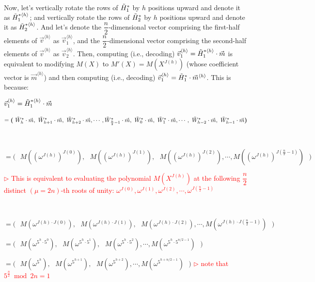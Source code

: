 Now, let's vertically rotate the rows of $\tilde{H}_1^*$ by $h$ positions upward and denote it as $\tilde{H}_1^{*\langle h \rangle}$; and vertically rotate the rows of $\tilde{H}_2^*$ by $h$ positions upward and denote it as $\tilde{H}_2^{*\langle h \rangle}$. And let's denote the $\dfrac{n}{2}$-dimensional vector comprising the first-half elements of $\vec{v}^{\langle h \rangle}$ as $\vec{v}_1^{\langle h \rangle}$, and the $\dfrac{n}{2}$-dimensional vector comprising the second-half elements of $\vec{v}^{\langle h \rangle}$ as $\vec{v}_2^{\langle h \rangle}$. 
Then, computing (i.e., decoding) $\vec{v}_1^{\langle h \rangle} = \tilde{H}_1^{*\langle h \rangle}\cdot \vec{m}$ is equivalent to modifying $M(X)$ to $M'(X) = M(X^{J(h)})$ (whose coefficient vector is $\vec{m}^{\langle h \rangle}$) and then computing (i.e., decoding) $\vec{v}_1^{\langle h \rangle} = \tilde{H}_1^{*}\cdot \vec{m}^{\langle h \rangle}$. This is because:

$\vec{v}_1^{\langle h \rangle} =\tilde{H}_1^{*\langle h \rangle}\cdot \vec{m}$

$ = \bm{(} \text{ } \tilde{W}^*_{h}\cdot\vec{m}, \text{ } \tilde{W}^*_{h+1}\cdot\vec{m}, \text{ } \tilde{W}^*_{h+2}\cdot\vec{m}, \cdots, \tilde{W}^*_{\frac{n}{2}-1}\cdot\vec{m}, \text{ } \tilde{W}^*_{0}\cdot\vec{m}, \text{ }\tilde{W}^*_{1}\cdot\vec{m}, \cdots, \text{ } \tilde{W}^*_{h-2}\cdot\vec{m}, \text{ } \tilde{W}^*_{h-1}\cdot\vec{m}  \bm{)}$

$ $

$= \bm{(} \text{ } M((\omega^{J(h)})^{J(0)}), \text{ } M((\omega^{J(h)})^{J(1)}), \text{ } M((\omega^{J(h)})^{J(2)}), \cdots, M((\omega^{J(h)})^{J(\frac{n}{2}-1)}) \text{ } \bm{)}$


\textcolor{red}{ $\rhd$ This is equivalent to evaluating the polynomial $M(X^{J(h)})$ at the following $\dfrac{n}{2}$ distinct $(\mu=2n)$-th roots of unity: $\omega^{J(0)}, \omega^{J(1)},  \omega^{J(2)}, \cdots, \omega^{J(\frac{n}{2} - 1)}$}

$ $

$= \bm{(} \text{ } M(\omega^{J(h)\cdot J(0)}), \text{ } M(\omega^{J(h)\cdot J(1)}), \text{ } M(\omega^{J(h)\cdot J(2)}), \cdots, M(\omega^{J(h)\cdot J(\frac{n}{2}-1)}) \text{ } \bm{)}$

$= \bm{(} \text{ } M(\omega^{5^h\cdot 5^0}), \text{ } M(\omega^{5^h\cdot 5^1}), \text{ } M(\omega^{5^h\cdot 5^2}), \cdots, M(\omega^{5^h\cdot 5^{n/2-1}}) \text{ } \bm{)}$

$= \bm{(} \text{ } M(\omega^{5^{h}}), \text{ } M(\omega^{5^{h+1}}), \text{ } M(\omega^{5^{h+2}}), \cdots, M(\omega^{5^{h+n/2-1}}) \text{ } \bm{)}$ \textcolor{red}{ $\rhd$ note that $5^{\frac{n}{2}} \bmod 2n = 1$}

